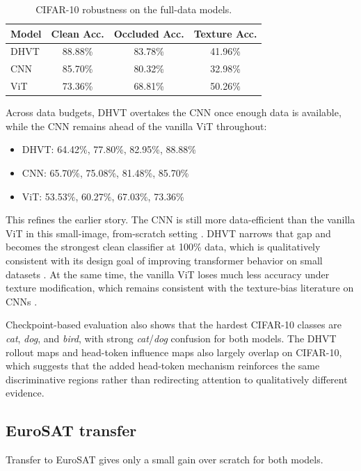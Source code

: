 \documentclass[11pt]{article}
\begin{document}
\begin{table}[H]
\centering
\caption{CIFAR-10 robustness on the full-data models.}
\begin{tabular}{lccc}
\toprule
Model & Clean Acc. & Occluded Acc. & Texture Acc. \\
\midrule
DHVT & 88.88\% & 83.78\% & 41.96\% \\
CNN & 85.70\% & 80.32\% & 32.98\% \\
ViT & 73.36\% & 68.81\% & 50.26\% \\
\bottomrule
\end{tabular}
\end{table}

Across data budgets, DHVT overtakes the CNN once enough data is available, while the CNN remains ahead of the vanilla ViT throughout:
\begin{itemize}
    \item DHVT: 64.42\%, 77.80\%, 82.95\%, 88.88\%
    \item CNN: 65.70\%, 75.08\%, 81.48\%, 85.70\%
    \item ViT: 53.53\%, 60.27\%, 67.03\%, 73.36\%
\end{itemize}

This refines the earlier story. The CNN is still more data-efficient than the vanilla ViT in this small-image, from-scratch setting \cite{dosovitskiy2021image,touvron2021training}. DHVT narrows that gap and becomes the strongest clean classifier at 100\% data, which is qualitatively consistent with its design goal of improving transformer behavior on small datasets \cite{lu2022bridging}. At the same time, the vanilla ViT loses much less accuracy under texture modification, which remains consistent with the texture-bias literature on CNNs \cite{geirhos2019imagenet}.

Checkpoint-based evaluation also shows that the hardest CIFAR-10 classes are \textit{cat}, \textit{dog}, and \textit{bird}, with strong \textit{cat}/\textit{dog} confusion for both models.
The DHVT rollout maps and head-token influence maps also largely overlap on CIFAR-10, which suggests that the added head-token mechanism reinforces the same discriminative regions rather than redirecting attention to qualitatively different evidence.

\subsection{EuroSAT transfer}
Transfer to EuroSAT gives only a small gain over scratch for both models.
\end{document}

